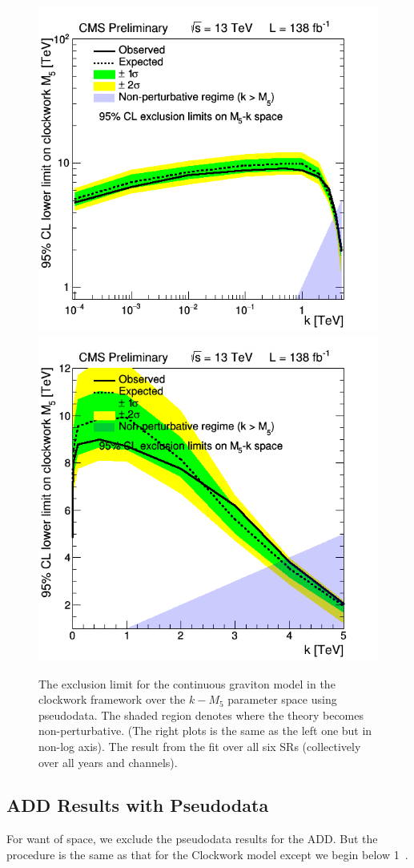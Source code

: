 \begin{figure}[h!]\centering
\includegraphics[width=0.49\linewidth]{fig/LIMITPLOT_BBBE161718_CWk.png}
\includegraphics[width=0.47\linewidth]{fig/LIMITPLOT_BBBE161718_CWk_nonLog.png}
\caption{The exclusion limit for the continuous graviton model in the clockwork framework over the $k-M_5$ parameter space using pseudodata.
The shaded region denotes where the theory becomes non-perturbative.
(The right plots is the same as the left one but in non-log axis).
The result from the fit over all six SRs (collectively over all years and channels).}
\label{Fig:LIMIT_Clockwork}
\end{figure}

\subsection{ADD Results with Pseudodata}

For want of space, we exclude the pseudodata results for the ADD. But the procedure is the same as that for the Clockwork model except we begin below 1~\TeV.